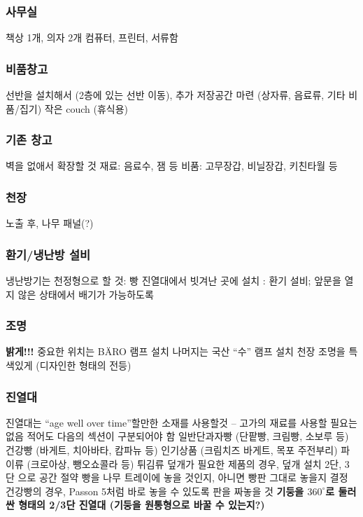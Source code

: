 \documentclass{myproc}
\begin{document}
\subsubsection{사무실}
\bit
\w 책상 1개, 의자 2개
\w 컴퓨터, 프린터, 서류함
\eit

\subsubsection{비품창고}
\bit
\w 선반을 설치해서 (2층에 있는 선반 이동),
     추가 저장공간 마련 (상자류, 음료류, 기타 비품/집기)
\w 작은 couch (휴식용)
\eit

\subsubsection{기존 창고}
\bit
\w 벽을 없애서 확장할 것
\w 재료: 음료수, 잼 등
\w 비품: 고무장갑, 비닐장갑, 키친타월 등 
\eit

\subsubsection{천장}
\bit
\w 노출 후, 나무 패널(?)
\eit

\subsubsection{환기/냉난방 설비}
\bit
\w \textcolor{red2}{냉난방기는 천정형으로 할 것}: 빵 진열대에서 빗겨난 곳에 설치
\w {}: 환기 설비; 앞문을 열지 않은 상태에서 배기가 가능하도록
\eit

\subsubsection{조명}
\bit
\w \textcolor{red2}{\bf{}밝게!!!}
\w 중요한 위치는 B\"{A}RO 램프 설치
\w 나머지는 국산 ``수'' 램프 설치
\w 천장 조명을 특색있게 (디자인한 형태의 전등)
\eit

\subsubsection{진열대}
\bit
\w 진열대는 ``age well over time''할만한 소재를 사용할것 -- 고가의 재료를
사용할 필요는 없음
\w 적어도 다음의 섹션이 구분되어야 함
  \bit
  \w 일반단과자빵  (단팥빵, 크림빵, 소보루 등)
  \w 건강빵 (바게트, 치아바타, 캄파뉴 등)
  \w 인기상품 (크림치즈 바게트, 목포 주전부리)
  \w 파이류 (크로아상, 뺑오쇼콜라 등)
  \w 튀김류 
  \eit
\w 덮개가 필요한 제품의 경우, 덮개 설치
\w 2단, 3단 으로 공간 절약
\w 빵을 나무 트레이에 놓을 것인지, 아니면 빵판 그대로 놓을지 결정
\w 건강빵의 경우, Passon 5처럼 바로 놓을 수 있도록 판을 짜놓을 것
\w \textcolor{red2}{\bf{}기둥을 $360^\circ$로 둘러싼 형태의 2/3단 진열대 (기둥을
  원통형으로 바꿀 수 있는지?)}
\eit
\end{document}

